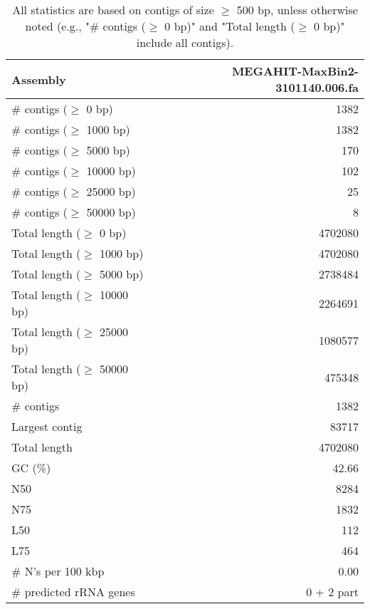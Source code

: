 \documentclass[12pt,a4paper]{article}
\begin{document}
\begin{table}[ht]
\begin{center}
\caption{All statistics are based on contigs of size $\geq$ 500 bp, unless otherwise noted (e.g., "\# contigs ($\geq$ 0 bp)" and "Total length ($\geq$ 0 bp)" include all contigs).}
\begin{tabular}{|l*{1}{|r}|}
\hline
Assembly & MEGAHIT-MaxBin2-3101140.006.fa \\ \hline
\# contigs ($\geq$ 0 bp) & 1382 \\ \hline
\# contigs ($\geq$ 1000 bp) & 1382 \\ \hline
\# contigs ($\geq$ 5000 bp) & 170 \\ \hline
\# contigs ($\geq$ 10000 bp) & 102 \\ \hline
\# contigs ($\geq$ 25000 bp) & 25 \\ \hline
\# contigs ($\geq$ 50000 bp) & 8 \\ \hline
Total length ($\geq$ 0 bp) & 4702080 \\ \hline
Total length ($\geq$ 1000 bp) & 4702080 \\ \hline
Total length ($\geq$ 5000 bp) & 2738484 \\ \hline
Total length ($\geq$ 10000 bp) & 2264691 \\ \hline
Total length ($\geq$ 25000 bp) & 1080577 \\ \hline
Total length ($\geq$ 50000 bp) & 475348 \\ \hline
\# contigs & 1382 \\ \hline
Largest contig & 83717 \\ \hline
Total length & 4702080 \\ \hline
GC (\%) & 42.66 \\ \hline
N50 & 8284 \\ \hline
N75 & 1832 \\ \hline
L50 & 112 \\ \hline
L75 & 464 \\ \hline
\# N's per 100 kbp & 0.00 \\ \hline
\# predicted rRNA genes & 0 + 2 part \\ \hline
\end{tabular}
\end{center}
\end{table}
\end{document}
